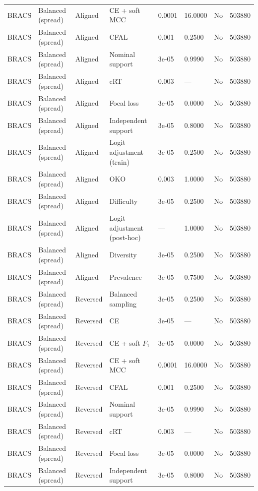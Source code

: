 \begin{longtable}{lllllllr}
BRACS & Balanced (spread) & Aligned & CE + soft MCC & 0.0001 & 16.0000 & No & 503880 \\
BRACS & Balanced (spread) & Aligned & CFAL & 0.001 & 0.2500 & No & 503880 \\
BRACS & Balanced (spread) & Aligned & Nominal support & 3e-05 & 0.9990 & No & 503880 \\
BRACS & Balanced (spread) & Aligned & cRT & 0.003 & --- & No & 503880 \\
BRACS & Balanced (spread) & Aligned & Focal loss & 3e-05 & 0.0000 & No & 503880 \\
BRACS & Balanced (spread) & Aligned & Independent support & 3e-05 & 0.8000 & No & 503880 \\
BRACS & Balanced (spread) & Aligned & Logit adjustment (train) & 3e-05 & 0.2500 & No & 503880 \\
BRACS & Balanced (spread) & Aligned & OKO & 0.003 & 1.0000 & No & 503880 \\
BRACS & Balanced (spread) & Aligned & Difficulty & 3e-05 & 0.2500 & No & 503880 \\
BRACS & Balanced (spread) & Aligned & Logit adjustment (post-hoc) & --- & 1.0000 & No & 503880 \\
BRACS & Balanced (spread) & Aligned & Diversity & 3e-05 & 0.2500 & No & 503880 \\
BRACS & Balanced (spread) & Aligned & Prevalence & 3e-05 & 0.7500 & No & 503880 \\
BRACS & Balanced (spread) & Reversed & Balanced sampling & 3e-05 & 0.2500 & No & 503880 \\
BRACS & Balanced (spread) & Reversed & CE & 3e-05 & --- & No & 503880 \\
BRACS & Balanced (spread) & Reversed & CE + soft $F_1$ & 3e-05 & 0.0000 & No & 503880 \\
BRACS & Balanced (spread) & Reversed & CE + soft MCC & 0.0001 & 16.0000 & No & 503880 \\
BRACS & Balanced (spread) & Reversed & CFAL & 0.001 & 0.2500 & No & 503880 \\
BRACS & Balanced (spread) & Reversed & Nominal support & 3e-05 & 0.9990 & No & 503880 \\
BRACS & Balanced (spread) & Reversed & cRT & 0.003 & --- & No & 503880 \\
BRACS & Balanced (spread) & Reversed & Focal loss & 3e-05 & 0.0000 & No & 503880 \\
BRACS & Balanced (spread) & Reversed & Independent support & 3e-05 & 0.8000 & No & 503880 \\

\end{longtable}
